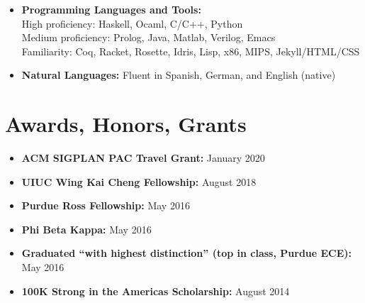\documentclass[12pt,a4paper,sans]{moderncv}        %
\begin{document}
\begin{itemize}

\item \textbf{Programming Languages and Tools:} \\
  High proficiency: Haskell, Ocaml, C/C++, Python
  \\ Medium proficiency: Prolog, Java, Matlab, Verilog, Emacs
  \\ Familiarity: Coq, Racket, Rosette, Idris, Lisp, x86, MIPS, Jekyll/HTML/CSS
\vspace{4pt}



\item \textbf{Natural Languages:} Fluent in Spanish, German, and English (native)

\vspace{4pt}


\end{itemize}

\section{Awards, Honors, Grants}

\vspace{4pt}

\begin{itemize}

\item \textbf{ACM SIGPLAN PAC Travel Grant:} January 2020
\vspace{4pt}
\item \textbf{UIUC Wing Kai Cheng Fellowship:} August 2018
\vspace{4pt}
\item \textbf{Purdue Ross Fellowship:} May 2016
\vspace{4pt}
\item \textbf{Phi Beta Kappa:} May 2016
\vspace{4pt}
\item \textbf{Graduated ``with highest distinction'' (top in class,
    Purdue ECE):} May 2016
\vspace{4pt}
\item \textbf{100K Strong in the Americas Scholarship:} August 2014

\end{itemize}
\end{document}

